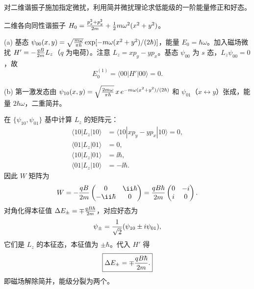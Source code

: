 \begin{question}
对二维谐振子施加指定微扰，利用简并微扰理论求低能级的一阶能量修正和好态。
\end{question}
\begin{solution}
二维各向同性谐振子 $H_0 = {p_x^2+p_y^2\over2m}+{1\over2}m\omega^2(x^2+y^2)$。

(a) 基态 $\psi_{00}(x,y)=\sqrt{m\omega\over\pi\hbar}\exp[-m\omega(x^2+y^2)/(2\hbar)]$，能量 $E_0=\hbar\omega$。加入磁场微扰 $H' = -{qB\over2m}L_z$（$q$ 为电荷）。注意 $L_z = xp_y - yp_x$。基态 $\psi_{00}$ 为 $s$ 态，$L_z\psi_{00}=0$，故
\[
E_0^{(1)}=\langle00|H'|00\rangle=0.
\]

(b) 第一激发态由 $\psi_{10}(x,y)=\sqrt{2m\omega\over\pi\hbar}\,x\,e^{-m\omega(x^2+y^2)/(2\hbar)}$ 和 $\psi_{01}$（$x\leftrightarrow y$）张成，能量 $2\hbar\omega$，二重简并。

在 $\{\psi_{10},\psi_{01}\}$ 基中计算 $L_z$ 的矩阵元：
\[
\begin{aligned}
\langle10|L_z|10\rangle &= \langle10|xp_y-yp_x|10\rangle = 0,\\
\langle01|L_z|01\rangle &= 0,\\
\langle10|L_z|01\rangle &= \ii\hbar,\\
\langle01|L_z|10\rangle &= -\ii\hbar.
\end{aligned}
\]
因此 $W$ 矩阵为
\[
W = -{qB\over2m}\begin{pmatrix}0 & \ii\hbar\\ -\ii\hbar & 0\end{pmatrix}
= {qB\hbar\over2m}\begin{pmatrix}0 & -i\\ i & 0\end{pmatrix}.
\]
对角化得本征值 $\Delta E_\pm = \mp {qB\hbar\over2m}$，对应好态为
\[
\psi_\pm = {1\over\sqrt2}(\psi_{10} \pm i\psi_{01}),
\]
它们是 $L_z$ 的本征态，本征值为 $\pm\hbar$。代入 $H'$ 得
\[
\boxed{\Delta E_\pm = \mp {qB\hbar\over2m}.}
\]
即磁场解除简并，能级分裂为两个。
\end{solution}


